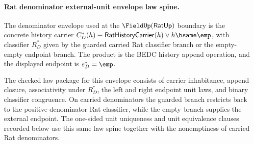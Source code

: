 \paragraph{Rat denominator external-unit envelope law spine.}
The denominator envelope used at the $\FieldUp(\mathsf{RatUp})$ boundary is the
concrete history carrier
$C_D^\ast(h)\equiv \mathsf{RatHistoryCarrier}(h)\lor h\hsame\emp$, with
classifier $R_D^\ast$ given by the guarded carried Rat classifier branch or the
empty-empty endpoint branch. The product is the BEDC history append operation,
and the displayed endpoint is $e_D^\ast=\emp$.

The checked law package for this envelope consists of carrier inhabitance,
append closure, associativity under $R_D^\ast$, the left and right endpoint unit
laws, and binary classifier congruence. On carried denominators the guarded
branch restricts back to the positive-denominator Rat classifier, while the
empty branch supplies the external endpoint. The one-sided unit uniqueness and
unit equivalence clauses recorded below use this same law spine together with
the nonemptiness of carried Rat denominators.
